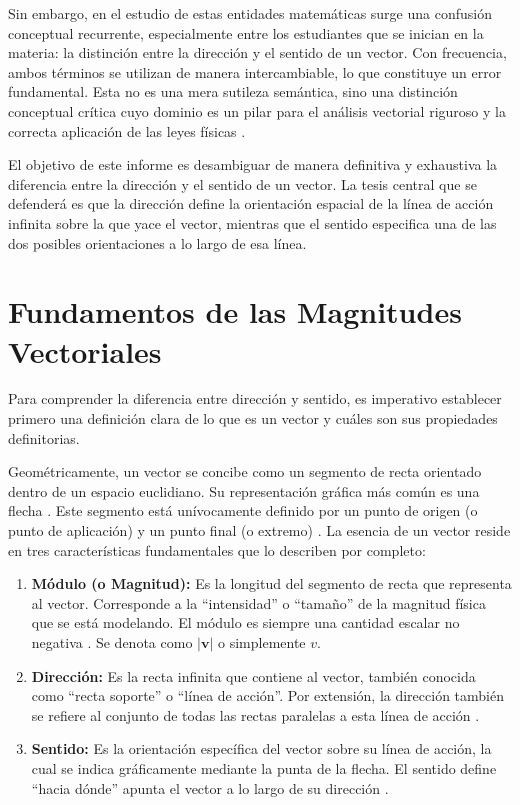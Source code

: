 \documentclass[conference]{IEEEtran}
\begin{document}
Sin embargo, en el estudio de estas entidades matemáticas surge una confusión conceptual recurrente, especialmente entre los estudiantes que se inician en la materia: la distinción entre la dirección y el sentido de un vector. Con frecuencia, ambos términos se utilizan de manera intercambiable, lo que constituye un error fundamental. Esta no es una mera sutileza semántica, sino una distinción conceptual crítica cuyo dominio es un pilar para el análisis vectorial riguroso y la correcta aplicación de las leyes físicas \cite{kolman2006algebra}.

El objetivo de este informe es desambiguar de manera definitiva y exhaustiva la diferencia entre la dirección y el sentido de un vector. La tesis central que se defenderá es que la dirección define la orientación espacial de la línea de acción infinita sobre la que yace el vector, mientras que el sentido especifica una de las dos posibles orientaciones a lo largo de esa línea.

\section{Fundamentos de las Magnitudes Vectoriales}

Para comprender la diferencia entre dirección y sentido, es imperativo establecer primero una definición clara de lo que es un vector y cuáles son sus propiedades definitorias.

Geométricamente, un vector se concibe como un segmento de recta orientado dentro de un espacio euclidiano. Su representación gráfica más común es una flecha \cite{kolman2006algebra}. Este segmento está unívocamente definido por un punto de origen (o punto de aplicación) y un punto final (o extremo) \cite{kolman2006algebra}. La esencia de un vector reside en tres características fundamentales que lo describen por completo:

\begin{enumerate}
\item \textbf{Módulo (o Magnitud):} Es la longitud del segmento de recta que representa al vector. Corresponde a la ``intensidad'' o ``tamaño'' de la magnitud física que se está modelando. El módulo es siempre una cantidad escalar no negativa \cite{grossman2012algebra}. Se denota como $|\mathbf{v}|$ o simplemente $v$.

\item \textbf{Dirección:} Es la recta infinita que contiene al vector, también conocida como ``recta soporte'' o ``línea de acción''. Por extensión, la dirección también se refiere al conjunto de todas las rectas paralelas a esta línea de acción \cite{kolman2006algebra}.

\item \textbf{Sentido:} Es la orientación específica del vector sobre su línea de acción, la cual se indica gráficamente mediante la punta de la flecha. El sentido define ``hacia dónde'' apunta el vector a lo largo de su dirección \cite{ferrovial2023vectores}.
\end{enumerate}
\end{document}
